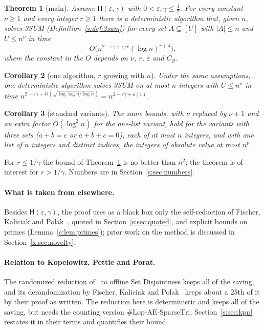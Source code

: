 \documentclass[11pt]{article}
\newtheorem{theorem}{Theorem}[section]
\newtheorem{corollary}[theorem]{Corollary}
\theoremstyle{definition}
\theoremstyle{remark}
\newcommand{\Lop}{\mathrm{Lop}\text{-}\allowbreak\mathrm{AE}\text{-}\allowbreak\mathrm{SparseTri}}
\newcommand{\Hyp}{\mathsf{H}}
\begin{document}
\begin{theorem}[main]\label{s:thm:main3sum}
Assume $\Hyp(\varepsilon,\gamma)$ with $0<\varepsilon,\gamma\le\frac12$. For every constant $\nu\ge1$ and every integer $r\ge1$ there is a deterministic algorithm that, given $n$, solves 3SUM (Definition~\ref{s:def:3sum}) for every set $A\subseteq[U]$ with $|A|\le n$ and $U\le n^\nu$ in time
\[
O\big(n^{2-\varepsilon\gamma+\varepsilon/r}(\log n)^{r+4}\big),
\]
where the constant in the $O$ depends on $\nu$, $r$, $\varepsilon$ and $C_{\mathcal O}$.
\end{theorem}

\begin{corollary}[one algorithm, $r$ growing with $n$]\label{s:cor:uniform}
Under the same assumptions, one deterministic algorithm solves 3SUM on at most $n$ integers with $U\le n^\nu$ in time $n^{2-\varepsilon\gamma+O(\sqrt{\log\log n/\log n})}=n^{2-\varepsilon\gamma+o(1)}$.
\end{corollary}

\begin{corollary}[standard variants]\label{s:cor:variants}
The same bounds, with $\nu$ replaced by $\nu+1$ and an extra factor $O(\log^2 n)$ for the one-list variant, hold for the variants with three sets ($a+b=c$ or $a+b+c=0$), each of at most $n$ integers, and with one list of $n$ integers and distinct indices, the integers of absolute value at most $n^\nu$.
\end{corollary}

For $r\le 1/\gamma$ the bound of Theorem~\ref{s:thm:main3sum} is no better than $n^2$; the theorem is of interest for $r>1/\gamma$. Numbers are in Section~\ref{s:sec:numbers}.

\paragraph{What is taken from elsewhere.} Besides $\Hyp(\varepsilon,\gamma)$, the proof uses as a black box only the self-reduction of Fischer, Kaliciak and Polak~\cite[Lemma~3.3]{FKP24}, quoted in Section~\ref{s:sec:quoted}, and explicit bounds on primes (Lemma~\ref{c:lem:primes}); prior work on the method is discussed in Section~\ref{x:sec:novelty}.

\paragraph{Relation to Kopelowitz, Pettie and Porat.} The randomized reduction of~\cite{KPP16} to offline Set Disjointness keeps all of the saving, and its derandomization by Fischer, Kaliciak and Polak~\cite{FKP24} keeps about a 25th of it by their proof as written. The reduction here is deterministic and keeps all of the saving, but needs the counting version $\#\Lop$; Section~\ref{s:sec:kpp} restates it in their terms and quantifies their bound.
\end{document}
